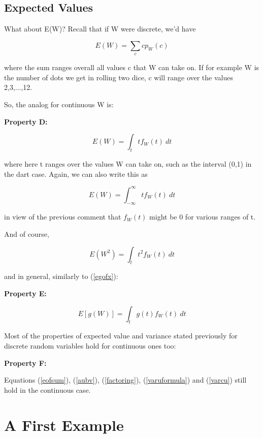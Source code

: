 \subsection{Expected Values}

What about E(W)?  Recall that if W were discrete, we'd have 

\begin{equation}
E(W) = \sum_{c} c p_W(c)
\end{equation}

where the sum ranges overall all values c that W can take on.  If for
example W is the number of dots we get in rolling two dice, c will range
over the values 2,3,...,12.

So, the analog for continuous W is:

{\bf Property D:}

\begin{equation}
E(W) = \int_t t f_W(t) ~ dt
\end{equation}

where here t ranges over the values W can take on, such as the interval
(0,1) in the dart case.  Again, we can also write this as

\begin{equation}
E(W) = \int_{-\infty}^{\infty}  t f_W(t) ~ dt
\end{equation}

in view of the previous comment that $f_W(t)$ might be 0 for various
ranges of t.

And of course, 

\begin{equation}
E(W^2) = \int_t t^2 f_W(t) ~ dt
\end{equation}

and in general, similarly to (\ref{egofx}):

{\bf Property E:}

\begin{equation}
\label{eofgofw}
E[g(W)] = \int_t g(t) f_W(t) ~ dt
\end{equation}

Most of the properties of expected value and variance stated previously
for discrete random variables hold for continuous ones too:

{\bf Property F:}

Equations (\ref{eofsum}), (\ref{aubv}), (\ref{factoring}),
(\ref{varuformula}) and (\ref{varcu}) still hold in the
continuous case.

\section{A First Example}
\label{afirstex}

